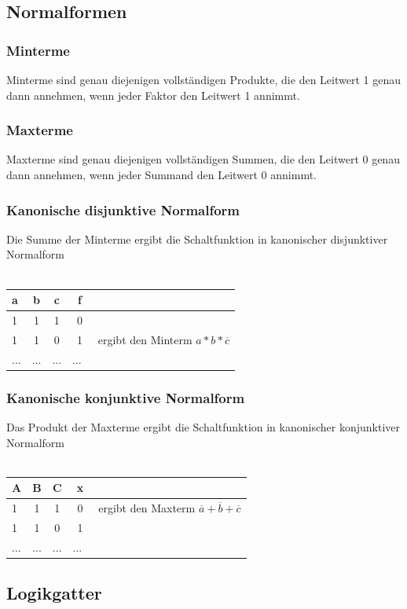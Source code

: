 \documentclass[a4paper,12pt]{scrartcl}
\begin{document}
\subsection{Normalformen}

\subsubsection{Minterme}
Minterme sind genau diejenigen vollständigen Produkte, die den Leitwert 1 genau dann annehmen, wenn jeder Faktor den Leitwert 1 annimmt.
\subsubsection{Maxterme}
Maxterme sind genau diejenigen vollständigen Summen, die den Leitwert 0 genau dann annehmen, wenn jeder Summand den Leitwert 0 annimmt.
\subsubsection{Kanonische disjunktive Normalform}
Die Summe der Minterme ergibt die Schaltfunktion in kanonischer disjunktiver Normalform \\ \\
\begin{tabular}{lcc|cc}
  a & b& c & f & \\
  \hline
  1 & 1 & 1 & 0 & \\
  1 & 1 & 0 & 1 & ergibt den Minterm $a * b * \overline{c}$\\
  ... & ... & ... & ...\
\end{tabular}
\subsubsection{Kanonische konjunktive Normalform}
Das Produkt der Maxterme ergibt die Schaltfunktion in kanonischer konjunktiver Normalform
 \\ \\
\begin{tabular}{lcc|cc}
  A & B & C & x & \\
  \hline
  1 & 1 & 1 & 0 & ergibt den Maxterm $\overline{a} + \overline{b} + \overline{c}$\\
  1 & 1 & 0 & 1 & \\
  ... & ... & ... & ...\
\end{tabular}

\subsection{Logikgatter}
\end{document}
